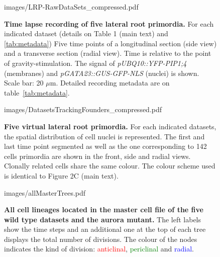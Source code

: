 \documentclass[11pt,a4paper, final]{article}
\begin{document}
%
\clearpage
%
\begin{figure}[htbp]
	\begin{center}
	\begin{overpic}[width=1.\linewidth]{images/LRP-RawDataSets_compressed.pdf}
	\end{overpic}
\caption[Time lapse recording of five lateral root primordia.]
{{\bf Time lapse recording of five lateral root primordia.} For each indicated dataset (details on Table 1 (main text) and \ref{tab:metadata}) Five time points of a longitudinal section (side view) and a transverse section (radial view). Time is relative to the point of gravity-stimulation. The signal of \textit{pUBQ10::YFP-PIP1;4} (membranes) and \textit{pGATA23::GUS-GFP-NLS} (nuclei) is shown. Scale bar: 20 $\mu$m. Detailed recording metadata are on table~\ref{tab:metadata}.}
	\label{fig:alldatasets}
	\end{center}
\end{figure}
%
\clearpage
\begin{figure}[htbp]
	\begin{center}
	\begin{overpic}[width=1.\linewidth]{images/DatasetsTrackingFounders_compressed.pdf}
	\end{overpic}
\caption[Five virtual lateral root primordia.]
{{\bf Five virtual lateral root primordia.} For each indicated datasets, the spatial distribution of cell nuclei is represented. The first and last time point segmented as well as the one corresponding to 142 cells primordia are shown in the front, side and radial views. Clonally related cells share the same colour. The colour scheme used is identical to Figure 2C (main text). }
	\label{fig:trackingfounders}
	\end{center}
\end{figure}
%
\clearpage
%
\begin{figure}[htbp]
	\begin{center}
		\begin{overpic}[width=0.95\linewidth]{images/allMasterTrees.pdf}
		\end{overpic}
\caption[All cell lineages located in the master cell file of the five wild type datasets and the aurora mutant.]
{
{\bf All cell lineages located in the master cell file of the five wild type datasets and the aurora mutant.} The left labels show the time steps and an additional one at the top of each tree displays the total number of divisions. The colour of the nodes indicates the kind of division: \textcolor{red}{anticlinal}, \textcolor{green}{periclinal} and \textcolor{blue}{radial}.
}
	\label{fig:allMasterTrees}
	\end{center}
\end{figure}
\end{document}
